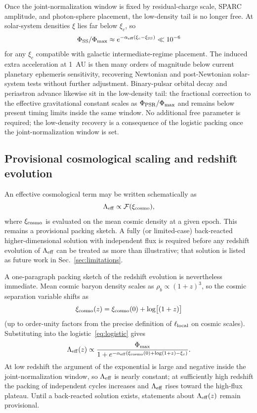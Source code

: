 \documentclass[11pt,a4paper]{article}
\begin{document}
Once the joint-normalization window is fixed by residual-charge scale, SPARC amplitude, and photon-sphere placement, the low-density tail is no longer free. At solar-system densities \(\xi\) lies far below \(\xi_c\), so
\begin{equation}
\Phi_{\rm SS}/\Phi_{\rm max}\approx e^{-\alpha_{\rm eff}(\xi_c-\xi_{\rm SS})}\ll 10^{-6}
\label{eq:Phi-SS}
\end{equation}
for any \(\xi_c\) compatible with galactic intermediate-regime placement. The induced extra acceleration at 1~AU is then many orders of magnitude below current planetary ephemeris sensitivity, recovering Newtonian and post-Newtonian solar-system tests without further adjustment. Binary-pulsar orbital decay and periastron advance likewise sit in the low-density tail: the fractional correction to the effective gravitational constant scales as \(\Phi_{\rm PSR}/\Phi_{\rm max}\) and remains below present timing limits inside the same window. No additional free parameter is required; the low-density recovery is a consequence of the logistic packing once the joint-normalization window is set.

\subsection{Provisional cosmological scaling and redshift evolution}
\label{sec:cosmo}

An effective cosmological term may be written schematically as
\begin{equation}
\Lambda_{\rm eff}\propto\mathcal{F}(\xi_{\rm cosmo}),
\label{eq:Lambda-eff}
\end{equation}
where \(\xi_{\rm cosmo}\) is evaluated on the mean cosmic density at a given epoch. This remains a provisional packing sketch. A fully (or limited-case) back-reacted higher-dimensional solution with independent flux is required before any redshift evolution of \(\Lambda_{\rm eff}\) can be treated as more than illustrative; that solution is listed as future work in Sec.~\ref{sec:limitations}.

A one-paragraph packing sketch of the redshift evolution is nevertheless immediate. Mean cosmic baryon density scales as \(\rho_b\propto(1+z)^3\), so the cosmic separation variable shifts as
\begin{equation}
\xi_{\rm cosmo}(z)=\xi_{\rm cosmo}(0)+\log\bigl[(1+z)\bigr]
\label{eq:xi-z}
\end{equation}
(up to order-unity factors from the precise definition of \(\ell_{\rm local}\) on cosmic scales). Substituting into the logistic~\eqref{eq:logistic} gives
\begin{equation}
\Lambda_{\rm eff}(z)\propto
\frac{\Phi_{\rm max}}{1+e^{-\alpha_{\rm eff}(\xi_{\rm cosmo}(0)+\log(1+z)-\xi_c)}}.
\label{eq:Lambda-z}
\end{equation}
At low redshift the argument of the exponential is large and negative inside the joint-normalization window, so \(\Lambda_{\rm eff}\) is nearly constant; at sufficiently high redshift the packing of independent cycles increases and \(\Lambda_{\rm eff}\) rises toward the high-flux plateau. Until a back-reacted solution exists, statements about \(\Lambda_{\rm eff}(z)\) remain provisional.
\end{document}

